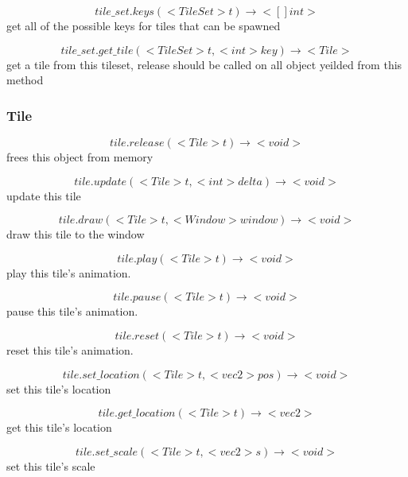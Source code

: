 \documentclass[11pt,fleqn]{book} %
\begin{document}
\begin{equation}
tile\_set.keys(<TileSet> t) \rightarrow <[]int>
\end{equation}
get all of the possible keys for tiles that can be spawned

\begin{equation}
tile\_set.get\_tile(<TileSet> t, <int> key) \rightarrow <Tile>
\end{equation}
get a tile from this tileset, release should be called on all object yeilded from this method

\subsubsection{Tile}
\begin{equation}
tile.release(<Tile> t) \rightarrow <void>
\end{equation}
frees this object from memory

\begin{equation}
tile.update(<Tile> t, <int> delta) \rightarrow <void>
\end{equation}
update this tile

\begin{equation}
tile.draw(<Tile> t, <Window> window) \rightarrow <void>
\end{equation}
draw this tile to the window

\begin{equation}
tile.play(<Tile> t) \rightarrow <void>
\end{equation}
play this tile's animation.

\begin{equation}
tile.pause(<Tile> t) \rightarrow <void>
\end{equation}
pause this tile's animation.

\begin{equation}
tile.reset(<Tile> t) \rightarrow <void>
\end{equation}
reset this tile's animation.

\begin{equation}
tile.set\_location(<Tile> t, <vec2> pos) \rightarrow <void>
\end{equation}
set this tile's location

\begin{equation}
tile.get\_location(<Tile> t) \rightarrow <vec2>
\end{equation}
get this tile's location

\begin{equation}
tile.set\_scale(<Tile> t, <vec2> s) \rightarrow <void>
\end{equation}
set this tile's scale
\end{document}
